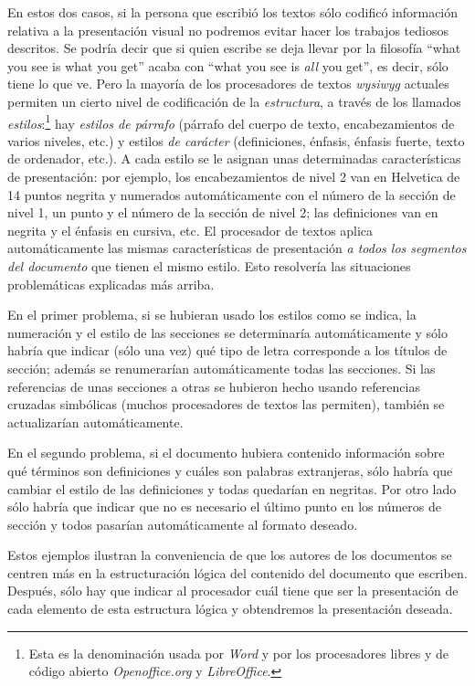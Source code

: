 En estos dos casos, si la persona que escribió los textos sólo codificó información relativa a la presentación visual no podremos evitar hacer los trabajos tediosos descritos. Se podría decir que si quien escribe se deja llevar por la filosofía ``what you see is what you get'' acaba con ``what you see is \emph{all} you get'', es decir, sólo tiene lo que ve. Pero la mayoría de los procesadores de textos \emph{wysiwyg} actuales permiten un cierto nivel de codificación de  la \emph{estructura}, a través de los llamados \emph{estilos}:\footnote{Esta es la denominación usada por \emph{Word} y por los procesadores libres y de código abierto \emph{Openoffice.org} y  \emph{LibreOffice}.} hay \emph{estilos de párrafo} (párrafo del cuerpo de texto, encabezamientos de varios niveles, etc.) y estilos \emph{de carácter} (definiciones, énfasis, énfasis fuerte, texto de ordenador, etc.).\label{pg:estil} A cada estilo se le asignan unas determinadas características de presentación: por ejemplo, los encabezamientos de nivel 2 van en Helvetica de 14 puntos negrita y numerados automáticamente con el número de la sección de nivel 1, un punto y el número de la sección de nivel 2; las definiciones van en negrita y el énfasis en cursiva, etc. El procesador de textos aplica automáticamente las mismas características de presentación \emph{a todos los segmentos del documento} que tienen el mismo estilo. Esto resolvería las situaciones problemáticas explicadas más arriba. 

En el primer problema, si se hubieran usado los estilos como se indica, la numeración y el estilo de las secciones se determinaría automáticamente y sólo habría que indicar (sólo una vez) qué tipo de letra corresponde a los títulos de sección; además se renumerarían automáticamente todas las secciones. Si las referencias de unas secciones a otras se hubieron hecho usando referencias cruzadas simbólicas (muchos procesadores de textos las permiten), también se actualizarían automáticamente. 

En el segundo problema, si el documento hubiera contenido información sobre qué términos son definiciones y cuáles son palabras extranjeras, sólo habría que cambiar el estilo de las definiciones y todas quedarían en negritas. Por otro lado sólo habría que indicar que no es necesario el último punto en los números de sección y todos pasarían automáticamente al formato deseado. 

Estos ejemplos ilustran la conveniencia de que los autores de los documentos se centren más en la estructuración lógica del contenido del documento que escriben. Después, sólo hay que indicar al procesador cuál tiene que ser la presentación de cada elemento de esta estructura lógica y obtendremos la presentación deseada. 

